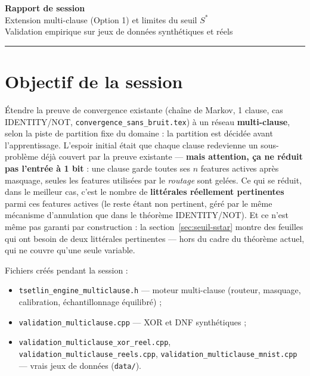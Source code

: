 \documentclass[12pt,a4paper]{article}
\theoremstyle{remark}
\newcommand{\Sstar}{S^{*}}
\begin{document}

\begin{center}
  {\LARGE\bfseries Rapport de session}\\[6pt]
  {\large Extension multi-clause (Option 1) et limites du seuil $\Sstar$}\\[12pt]
  {\normalsize Validation empirique sur jeux de données synthétiques et réels}
\end{center}

\vspace{1em}
\hrule
\vspace{1.5em}

\tableofcontents

\newpage

\section{Objectif de la session}

Étendre la preuve de convergence existante (chaîne de Markov, 1 clause, cas
IDENTITY/NOT, \texttt{convergence\_sans\_bruit.tex}) à un réseau
\textbf{multi-clause}, selon la piste de partition fixe du domaine : la
partition est décidée avant l'apprentissage. L'espoir initial était que
chaque clause redevienne un sous-problème déjà couvert par la preuve
existante --- \textbf{mais attention, ça ne réduit pas l'entrée à 1 bit} :
une clause garde toutes ses $n$ features actives après masquage, seules les
features utilisées par le \emph{routage} sont gelées. Ce qui se réduit, dans
le meilleur cas, c'est le nombre de \textbf{littérales réellement
pertinentes} parmi ces features actives (le reste étant non pertinent, géré
par le même mécanisme d'annulation que dans le théorème IDENTITY/NOT). Et ce
n'est même pas garanti par construction : la section~\ref{sec:seuil-sstar}
montre des feuilles qui ont besoin de deux littérales pertinentes --- hors
du cadre du théorème actuel, qui ne couvre qu'une seule variable.

Fichiers créés pendant la session :
\begin{itemize}
  \item \texttt{tsetlin\_engine\_multiclause.h} --- moteur multi-clause
        (routeur, masquage, calibration, échantillonnage équilibré) ;
  \item \texttt{validation\_multiclause.cpp} --- XOR et DNF synthétiques ;
  \item \texttt{validation\_multiclause\_xor\_reel.cpp},
        \texttt{validation\_multiclause\_reels.cpp},
        \texttt{validation\_multiclause\_mnist.cpp} --- vrais jeux de
        données (\texttt{data/}).
\end{itemize}
\end{document}

